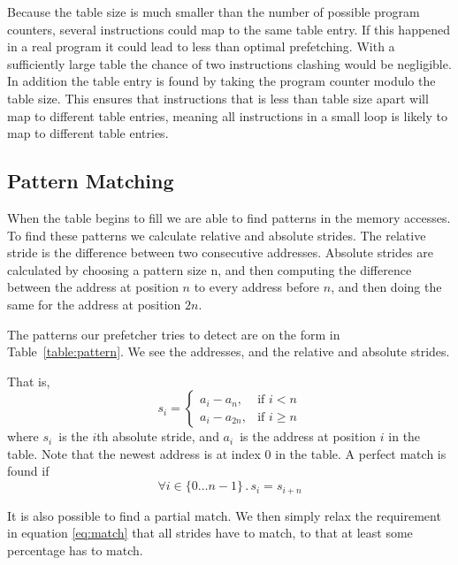 Because the table size is much smaller
than the number of possible program counters, several instructions could map to
the same table entry. If this happened in a real program it could lead to less
than optimal prefetching. With a sufficiently large table the chance of two
instructions clashing would be negligible. In addition the table entry is found
by taking the program counter modulo the table size. This ensures that
instructions that is less than table size apart will map to different table
entries, meaning all instructions in a small loop is likely to map to different
table entries.

\subsection{Pattern Matching}

When the table begins to fill we are able to find patterns in the memory accesses.
To find these patterns we calculate relative and absolute strides.
The relative stride is the difference between two consecutive
addresses. Absolute strides are calculated by choosing a pattern size n,
and then computing the difference between the address at position
$n$ to every address before $n$, and then doing the same for the address
at position $2n$.

The patterns our prefetcher tries to detect are on the form in
Table~\ref{table:pattern}.
We see the addresses, and the relative and absolute strides.


That is,
\[
	s_i = \begin{cases}
		a_i - a_n,    & \text{if } i  < n \\%
		a_i - a_{2n}, & \text{if } i \geq n %
	\end{cases}
\]
where $s_i$~is the $i$th absolute stride, and $a_i$~is the address at position
$i$ in the table. Note that the newest address is at index 0 in the table. A
perfect match is found if
\begin{equation}
\label{eq:match}
\forall i \in \{0 \dots n - 1\} \,.\, s_i = s_{i + n}
\end{equation}

It is also possible to find a partial match. We then simply relax the
requirement in equation \eqref{eq:match} that all strides have to match, to
that at least some percentage has to match.


